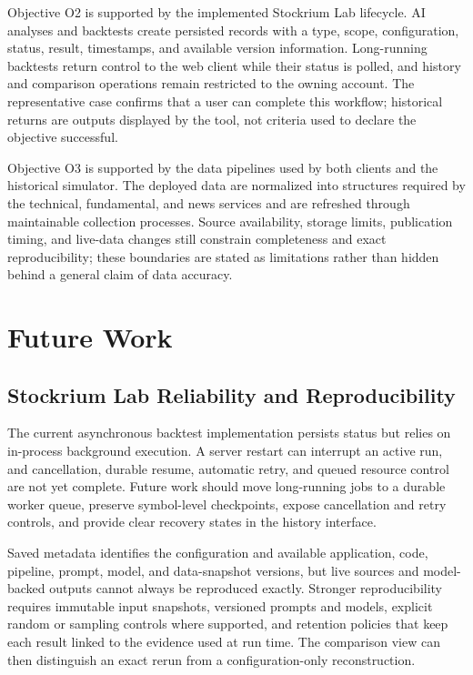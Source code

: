 Objective O2 is supported by the implemented Stockrium Lab lifecycle. AI analyses and backtests create persisted records with a type, scope, configuration, status, result, timestamps, and available version information. Long-running backtests return control to the web client while their status is polled, and history and comparison operations remain restricted to the owning account. The representative case confirms that a user can complete this workflow; historical returns are outputs displayed by the tool, not criteria used to declare the objective successful.

Objective O3 is supported by the data pipelines used by both clients and the historical simulator. The deployed data are normalized into structures required by the technical, fundamental, and news services and are refreshed through maintainable collection processes. Source availability, storage limits, publication timing, and live-data changes still constrain completeness and exact reproducibility; these boundaries are stated as limitations rather than hidden behind a general claim of data accuracy.

\section{Future Work}
\label{sec:future-work}

\subsection{Stockrium Lab Reliability and Reproducibility}

The current asynchronous backtest implementation persists status but relies on in-process background execution. A server restart can interrupt an active run, and cancellation, durable resume, automatic retry, and queued resource control are not yet complete. Future work should move long-running jobs to a durable worker queue, preserve symbol-level checkpoints, expose cancellation and retry controls, and provide clear recovery states in the history interface.

Saved metadata identifies the configuration and available application, code, pipeline, prompt, model, and data-snapshot versions, but live sources and model-backed outputs cannot always be reproduced exactly. Stronger reproducibility requires immutable input snapshots, versioned prompts and models, explicit random or sampling controls where supported, and retention policies that keep each result linked to the evidence used at run time. The comparison view can then distinguish an exact rerun from a configuration-only reconstruction.

